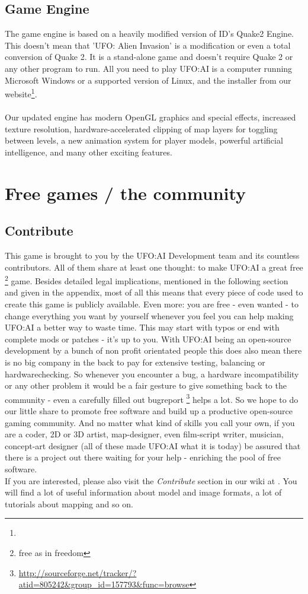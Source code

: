 \subsection{Game Engine}
The game engine is based on a heavily modified version of ID's Quake2 Engine. This doesn't mean that 'UFO: Alien Invasion' is a modification or even a total conversion of Quake 2. It is a stand-alone game and doesn't require Quake 2 or any other program to run. All you need to play UFO:AI is a computer running Microsoft Windows or a supported version of Linux, and the installer from our website\footnote{\ufohomepage}.\\
\\
Our updated engine has modern OpenGL graphics and special effects, increased texture resolution, hardware-accelerated clipping of map layers for toggling between levels, a new animation system for player models, powerful artificial intelligence, and many other exciting features.

\section{Free games / the community}
\subsection{Contribute}
This game is brought to you by the UFO:AI Development team and its countless contributors. All of them share at least one thought: to make UFO:AI a great free \footnote{free as in freedom} game. Besides detailed legal implications, mentioned in the following section and given in the appendix, most of all this means that every piece of code used to create this game is publicly available. Even more: you are free - even wanted - to change everything you want by yourself whenever you feel you can help making UFO:AI a better way to waste time. This may start with typos or end with complete mods or patches - it's up to you. With UFO:AI being an open-source development by a bunch of non profit orientated people this does also mean there is no big company in the back to pay for extensive testing, balancing or hardwarechecking. So whenever you encounter a bug, a hardware incompatibility or any other problem it would be a fair gesture to give something back to the community - even a carefully filled out bugreport \footnote{\url{http://sourceforge.net/tracker/?atid=805242&group_id=157793&func=browse}} helps a lot. So we hope to do our little share to promote free software and build up a productive open-source gaming community. And no matter what kind of skills you call your own, if you are a coder, 2D or 3D artist, map-designer, even film-script writer, musician, concept-art designer (all of these made UFO:AI what it is today) be assured that there is a project out there waiting for your help - enriching the pool of free software.\\
If you are interested, please also visit the \textit{Contribute} section in our wiki at \ufohomepage. You will find a lot of useful information about model and image formats, a lot of tutorials about mapping and so on.

